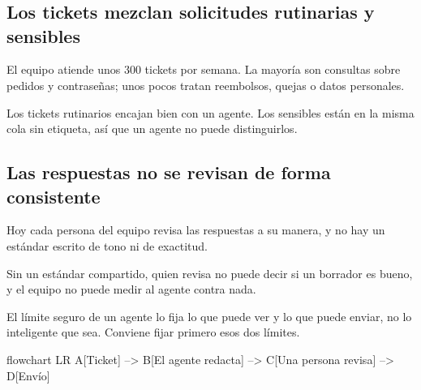 \section{\lblFound}
\subsection{Los tickets mezclan solicitudes rutinarias y sensibles}
\findingpart{\lblContext}
El equipo atiende unos 300 tickets por semana. La mayoría son consultas sobre
pedidos y contraseñas; unos pocos tratan reembolsos, quejas o datos personales.

\findingpart{\lblObservation}
Los tickets rutinarios encajan bien con un agente. Los sensibles están en la
misma cola sin etiqueta, así que un agente no puede distinguirlos.

\subsection{Las respuestas no se revisan de forma consistente}
\findingpart{\lblContext}
Hoy cada persona del equipo revisa las respuestas a su manera, y no hay un
estándar escrito de tono ni de exactitud.

\findingpart{\lblObservation}
Sin un estándar compartido, quien revisa no puede decir si un borrador es
bueno, y el equipo no puede medir al agente contra nada.

\begin{insight}
  El límite seguro de un agente lo fija lo que puede ver y lo que puede enviar,
  no lo inteligente que sea. Conviene fijar primero esos dos límites.
\end{insight}

\begin{mermaid}[style=editorial,width=0.9\linewidth,
    caption={Manejo propuesto de un ticket},pos=H]
  flowchart LR
  A[Ticket] --> B[El agente redacta] --> C[Una persona revisa] --> D[Envío]
\end{mermaid}

